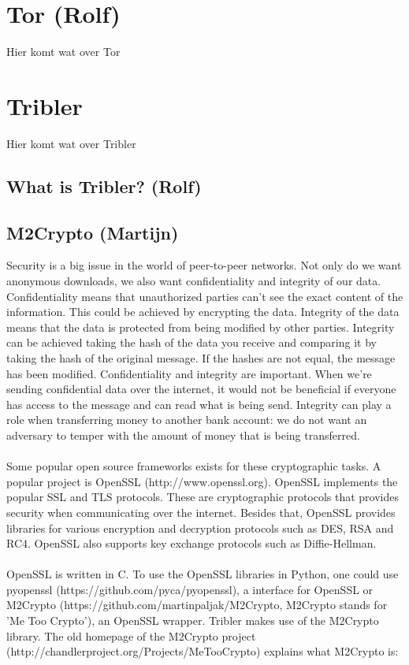 \documentclass[11pt]{article}
\begin{document}
\section{Tor (Rolf)}
Hier komt wat over Tor

\section{Tribler}
Hier komt wat over Tribler

\subsection{What is Tribler? (Rolf)}

\subsection{M2Crypto (Martijn)}
Security is a big issue in the world of peer-to-peer networks. Not only do we want anonymous downloads, we also want confidentiality and integrity of our data. Confidentiality means that unauthorized parties can't see the exact content of the information. This could be achieved by encrypting the data. Integrity of the data means that the data is protected from being modified by other parties. Integrity can be achieved taking the hash of the data you receive and comparing it by taking the hash of the original message. If the hashes are not equal, the message has been modified. Confidentiality and integrity are important. When we're sending confidential data over the internet, it would not be beneficial if everyone has access to the message and can read what is being send. Integrity can play a role when transferring money to another bank account: we do not want an adversary to temper with the amount of money that is being transferred.\\\\
Some popular open source frameworks exists for these cryptographic tasks. A popular project is OpenSSL (http://www.openssl.org). OpenSSL implements the popular SSL and TLS protocols. These are cryptographic protocols that provides security when communicating over the internet. Besides that, OpenSSL provides libraries for various encryption and decryption protocols such as DES, RSA and RC4. OpenSSL also supports key exchange protocols such as Diffie-Hellman.\\\\
OpenSSL is written in C. To use the OpenSSL libraries in Python, one could use pyopenssl (https://github.com/pyca/pyopenssl), a interface for OpenSSL or M2Crypto (https://github.com/martinpaljak/M2Crypto, M2Crypto stands for 'Me Too Crypto'), an OpenSSL wrapper. Tribler makes use of the M2Crypto library. The old homepage of the M2Crypto project (http://chandlerproject.org/Projects/MeTooCrypto) explains what M2Crypto is:\\\\
\end{document}
